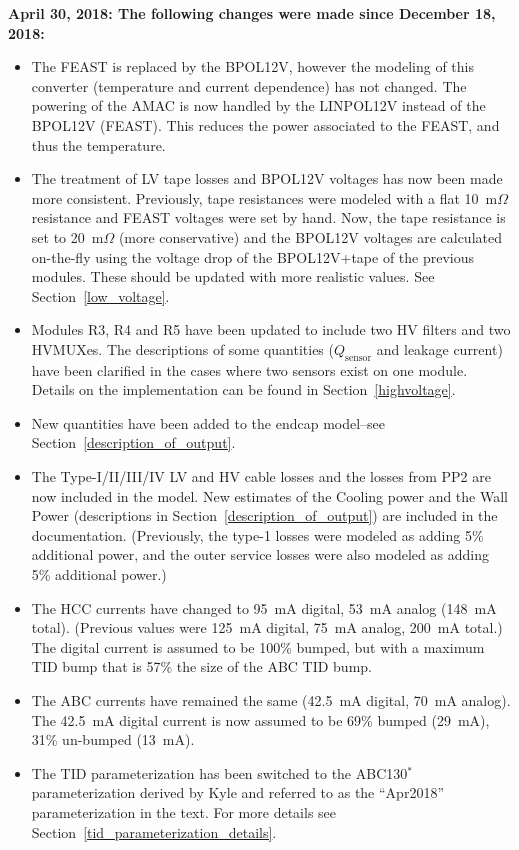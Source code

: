 \documentclass[10pt,]{article}
\begin{document}
{ \bf
April 30, 2018: The following changes were made since December 18, 2018:}
\begin{itemize}
\item The FEAST is replaced by the BPOL12V, however the modeling of this converter (temperature
  and current dependence) has not changed. The powering of the AMAC is now handled by the LINPOL12V
  instead of the BPOL12V (FEAST). This reduces the power associated to the FEAST, and thus the
  temperature.
\item The treatment of LV tape losses and BPOL12V voltages has now been made more consistent. Previously,
  tape resistances were modeled with a flat 10~m$\Omega$ resistance and FEAST voltages were set by hand.
  Now, the tape resistance is set to 20~m$\Omega$ (more conservative) and the
  BPOL12V voltages are calculated on-the-fly using the voltage drop of the BPOL12V+tape of
  the previous modules. These should be updated with more realistic values. See Section~\ref{low_voltage}.
\item Modules R3, R4 and R5 have been updated to include two HV filters and two HVMUXes. The descriptions
  of some quantities ($Q_\text{sensor}$ and leakage current) have been clarified in the cases where two sensors
  exist on one module. Details on the implementation can be found in Section~\ref{highvoltage}.
\item New quantities have been added to the endcap model--see Section~\ref{description_of_output}.
\item The Type-I/II/III/IV LV and HV cable losses and the losses from PP2 are now included in the model. New
  estimates of the Cooling power and the Wall Power (descriptions in Section~\ref{description_of_output})
  are included in the documentation. (Previously, the type-1 losses were modeled as adding 5\% additional power,
  and the outer service losses were also modeled as adding 5\% additional power.)
\item The HCC currents have changed to 95~mA digital, 53~mA analog (148~mA total). (Previous values
  were 125~mA digital, 75~mA analog, 200~mA total.) The digital current is assumed to be 100\% bumped, but
  with a maximum TID bump that is 57\% the size of the ABC TID bump.
\item The ABC currents have remained the same (42.5~mA digital, 70~mA analog).
  The 42.5~mA digital current is now assumed to be 69\% bumped (29~mA), 31\% un-bumped (13~mA).
\item The TID parameterization has been switched to the ABC130$^{*}$ parameterization derived by Kyle
  and referred to as the ``Apr2018'' parameterization in the text. For more details see
  Section~\ref{tid_parameterization_details}.
\end{itemize}
\end{document}

